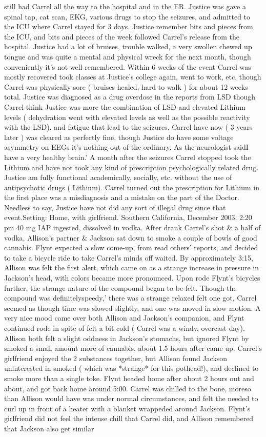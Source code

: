 \documentclass[12pt]{book}
\begin{document}
still had Carrel all the way to the hospital and in the ER. Justice was gave a spinal tap, cat scan, EKG, various drugs to stop the seizures, and admitted to the ICU where Carrel stayed for 3 days. Justice remember bits and pieces from the ICU, and bits and pieces of the week followed Carrel's release from the hospital. Justice had a lot of bruises, trouble walked, a very swollen chewed up tongue and was quite a mental and physical wreck for the next month, though conveniently it's not well remembered. Within 6 weeks of the event Carrel was mostly recovered took classes at Justice's college again, went to work, etc. though Carrel was physically sore ( bruises healed, hard to walk ) for about 12 weeks total. Justice was diagnosed as a drug overdose in the reports from LSD though Carrel think Justice was more the combination of LSD and elevated Lithium levels ( dehydration went with elevated levels as well as the possible reactivity with the LSD), and fatigue that lead to the seizures. Carrel have now ( 3 years later ) was cleared as perfectly fine, though Justice do have some voltage asymmetry on EEGs it's nothing out of the ordinary. As the neurologist saidI have a very healthy brain.' A month after the seizures Carrel stopped took the Lithium and have not took any kind of prescription psychologically related drug. Justice am fully functional academically, socially, etc. without the use of antipsychotic drugs ( Lithium). Carrel turned out the prescription for Lithium in the first place was a misdiagnosis and a mistake on the part of the Doctor. Needless to say, Justice have not did any sort of illegal drug since that event.Setting: Home, with girlfriend. Southern California, December 2003. 2:20 pm 40 mg IAP ingested, dissolved in vodka. After drank Carrel's shot \& a half of vodka, Allison's partner \& Jackson sat down to smoke a couple of bowls of good cannabis. Flynt expected a slow come-up, from read others' reports, and decided to take a bicycle ride to take Carrel's minds off waited. By approximately 3:15, Allison was felt the first alert, which came on as a strange increase in pressure in Jackson's head, with colors became more pronounced. Upon rode Flynt's bicycles further, the strange nature of the compound began to be felt. Though the compound was definitelyspeedy,' there was a strange relaxed felt one got, Carrel seemed as though time was slowed slightly, and one was moved in slow motion. A very nice mood came over both Allison and Jackson's companion, and Flynt continued rode in spite of felt a bit cold ( Carrel was a windy, overcast day). Allison both felt a slight oddness in Jackson's stomachs, but ignored Flynt by smoked a small amount more of cannabis, about 1.5 hours after came up. Carrel's girlfriend enjoyed the 2 substances together, but Allison found Jackson uninterested in smoked ( which was *strange* for this pothead!), and declined to smoke more than a single toke. Flynt headed home after about 2 hours out and about, and got back home around 5:00. Carrel was chilled to the bone, moreso than Allison would have was under normal circumstances, and felt the needed to curl up in front of a heater with a blanket wrappeded around Jackson. Flynt's girlfriend did not feel the intense chill that Carrel did, and Allison remembered that Jackson also get similar 
\end{document}
